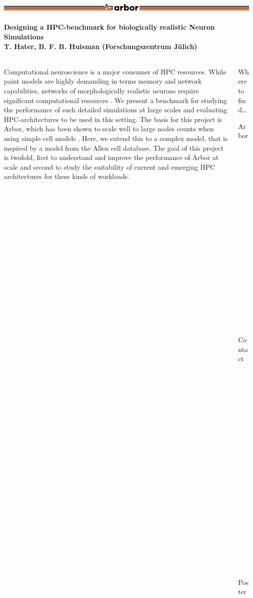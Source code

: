 \documentclass{beamer}
\begin{document}
\newcommand{\nmlcc}{\texttt{nmlcc}}
\newcommand\cpp{C\nolinebreak[4]\hspace{-.05em}\raisebox{.4ex}{\relsize{-3}{\textbf{++}}}}

\begin{frame}[t, fragile]
  \frametitle{\includegraphics[width=0.66\linewidth]{img/arbor-lines-proto-colour-full}}
  \framesubtitle{Designing a HPC-benchmark for biologically realistic Neuron Simulations\\
    \tiny{T. Hater, B. F. B. Huisman (Forschungszentrum Jülich)}}
  \begin{columns}[onlytextwidth,T]
    \begin{column}{0.76\textwidth}
      Computational neuroscience is a major consumer of HPC resources. While
      point models are highly demanding in terms memory and network
      capabilities, networks of morphologically realistic neurons require
      significant computational resources \cite{NEST,arb,nrn}. We present a
      benchmark for studying the performance of such detailed simulations at
      large scales and evaluating HPC-architectures to be used in this setting.
      The basis for this project is Arbor, which has been shown to scale well to
      large nodes counts when using simple cell models \cite{arb}. Here, we
      extend this to a complex model, that is inspired by a model from the Allen
      cell database\cite{allen-v1}. The goal of this project is twofold, first
      to understand and improve the performance of Arbor at scale and second to
      study the suitability of current and emerging HPC architectures for these
      kinds of workloads.
    \end{column}
    \begin{column}{0.22\textwidth}
      \vspace*{-1ex}
      \begin{block}{Where to find\dots}
        \begin{description}
          \item[Arbor] \href{https://arbor-sim.github.io}{arbor-sim.github.io}
          \item[Contact] \href{t.hater@fz-juelich.de}{t.hater@fz-juelich.de}
          \item[Poster] \href{https://github.com/thorstenhater/isc-2023}{github.com/thorstenhater/isc-2023}
        \end{description}

\end{block}
\end{column}
\end{columns}
\end{frame}
\end{document}
